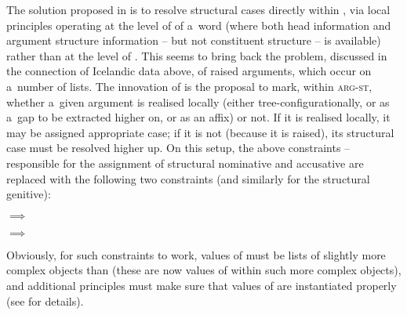 \documentclass[output=paper]{langsci/langscibook}
\begin{document}
The solution proposed in \citealt{prze:96,Prze99,Prze99b} is to resolve structural cases directly within , via local principles operating at the level of  of a~word (where both head information and argument structure information – but not constituent structure – is available) rather than at the level of .  This seems to bring back the problem, discussed in the connection of Icelandic data above, of raised arguments, which occur on a~number of  lists.  The innovation of \citealt{prze:96,Prze99,Prze99b} is the proposal to mark, within \textsc{arg-st}, whether a~given argument is realised locally (either tree-con\-fi\-gu\-ra\-tio\-nal\-ly, or as a~gap to be extracted higher on, or as an affix) or not.  If it is realised locally, it may be assigned appropriate case; if it is not (because it is raised), its structural case must be resolved higher up.  On this setup, the above constraints – responsible for the assignment of structural nominative and accusative are replaced with the following two constraints (and similarly for the structural genitive):
\begin{examples}
\item \label{nonc:cp:germ1}
  $\implies$ 
\item \label{nonc:cp:germ2}
  $\implies$ 
\end{examples}
Obviously, for such constraints to work, values of  must be lists of slightly more complex objects than  (these are now values of  within such more complex objects), and additional principles must make sure that values of  are instantiated properly (see \citealt[78–79]{Prze99b} for details).
\end{document}
